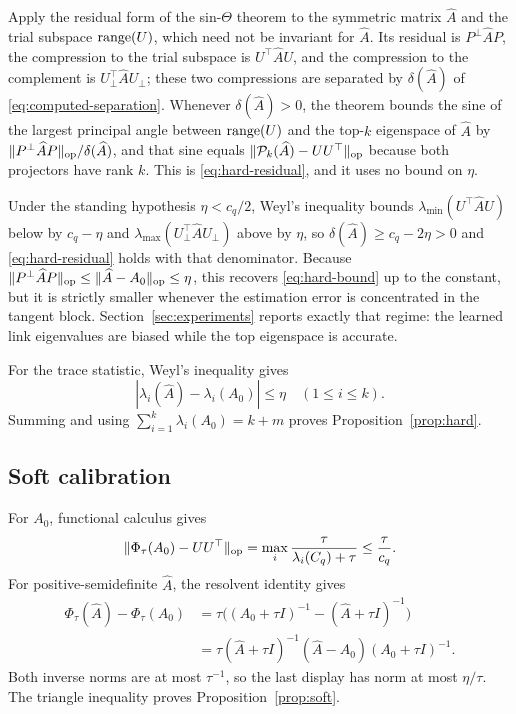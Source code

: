Apply the residual form of the sin-$\Theta$ theorem
\citep{daviskahan1970rotation} to the symmetric matrix $\widehat A$ and the
trial subspace $\operatorname{range}(U)$, which need not be invariant for $\widehat A$.  Its
residual is $P^\perp\widehat AP$, the compression to the trial subspace is
$U^\top\widehat AU$, and the compression to the complement is
$U_\perp^\top\widehat AU_\perp$; these two compressions are separated by
$\delta(\widehat A)$ of \eqref{eq:computed-separation}.  Whenever
$\delta(\widehat A)>0$, the theorem bounds the sine of the largest principal
angle between $\operatorname{range}(U)$ and the top-$k$ eigenspace of $\widehat A$ by
$\|P^\perp\widehat AP\|_{\mathrm{op}}/\delta(\widehat A)$, and that sine equals
$\|\mathcal P_k(\widehat A)-UU^\top\|_{\mathrm{op}}$ because both projectors have rank
$k$.  This is \eqref{eq:hard-residual}, and it uses no bound on $\eta$.

Under the standing hypothesis $\eta<c_q/2$, Weyl's inequality bounds
$\lambda_{\min}(U^\top\widehat AU)$ below by $c_q-\eta$ and
$\lambda_{\max}(U_\perp^\top\widehat AU_\perp)$ above by $\eta$, so
$\delta(\widehat A)\ge c_q-2\eta>0$ and \eqref{eq:hard-residual} holds with that
denominator.  Because $\|P^\perp\widehat AP\|_{\mathrm{op}}\le\|\widehat A-A_0\|_{\mathrm{op}}\le\eta$,
this recovers \eqref{eq:hard-bound} up to the constant, but it is strictly
smaller whenever the estimation error is concentrated in the tangent block.
Section~\ref{sec:experiments} reports exactly that regime: the learned link
eigenvalues are biased while the top eigenspace is accurate.

For the trace statistic, Weyl's inequality gives
\[
  |\lambda_i(\widehat A)-\lambda_i(A_0)|\le\eta
  \quad (1\le i\le k).
\]
Summing and using $\sum_{i=1}^k\lambda_i(A_0)=k+m$ proves Proposition~\ref{prop:hard}.

\subsection{Soft calibration}

For $A_0$, functional calculus gives
\[
  \|\Phi_\tau(A_0)-UU^\top\|_{\mathrm{op}}
  =
  \max_i\frac{\tau}{\lambda_i(C_q)+\tau}
  \le\frac{\tau}{c_q}.
\]
For positive-semidefinite $\widehat A$, the resolvent identity gives
\begin{align}
  \Phi_\tau(\widehat A)-\Phi_\tau(A_0)
  &=
  \tau\bigl((A_0+\tau I)^{-1}
  -(\widehat A+\tau I)^{-1}\bigr)\\
  &=
  \tau(\widehat A+\tau I)^{-1}
  (\widehat A-A_0)(A_0+\tau I)^{-1}.
\end{align}
Both inverse norms are at most $\tau^{-1}$, so the last display has norm at most $\eta/\tau$.  The triangle inequality proves Proposition~\ref{prop:soft}.

